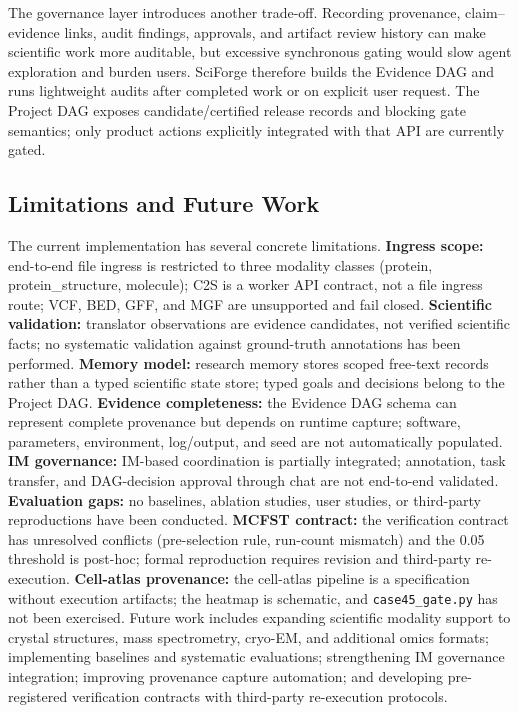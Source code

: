 \documentclass[sn-basic,Numbered,pdflatex]{sn-jnl}
\begin{document}
The governance layer introduces another trade-off. Recording provenance, claim--evidence links, audit findings, approvals, and artifact review history can make scientific work more auditable, but excessive synchronous gating would slow agent exploration and burden users. SciForge therefore builds the Evidence DAG and runs lightweight audits after completed work or on explicit user request. The Project DAG exposes candidate/certified release records and blocking gate semantics; only product actions explicitly integrated with that API are currently gated.

\subsection{Limitations and Future Work}

The current implementation has several concrete limitations. \textbf{Ingress scope:} end-to-end file ingress is restricted to three modality classes (protein, protein\_structure, molecule); C2S is a worker API contract, not a file ingress route; VCF, BED, GFF, and MGF are unsupported and fail closed. \textbf{Scientific validation:} translator observations are evidence candidates, not verified scientific facts; no systematic validation against ground-truth annotations has been performed. \textbf{Memory model:} research memory stores scoped free-text records rather than a typed scientific state store; typed goals and decisions belong to the Project DAG. \textbf{Evidence completeness:} the Evidence DAG schema can represent complete provenance but depends on runtime capture; software, parameters, environment, log/output, and seed are not automatically populated. \textbf{IM governance:} IM-based coordination is partially integrated; annotation, task transfer, and DAG-decision approval through chat are not end-to-end validated. \textbf{Evaluation gaps:} no baselines, ablation studies, user studies, or third-party reproductions have been conducted. \textbf{MCFST contract:} the verification contract has unresolved conflicts (pre-selection rule, run-count mismatch) and the 0.05 threshold is post-hoc; formal reproduction requires revision and third-party re-execution. \textbf{Cell-atlas provenance:} the cell-atlas pipeline is a specification without execution artifacts; the heatmap is schematic, and \texttt{case45\_gate.py} has not been exercised. Future work includes expanding scientific modality support to crystal structures, mass spectrometry, cryo-EM, and additional omics formats; implementing baselines and systematic evaluations; strengthening IM governance integration; improving provenance capture automation; and developing pre-registered verification contracts with third-party re-execution protocols.
\end{document}
